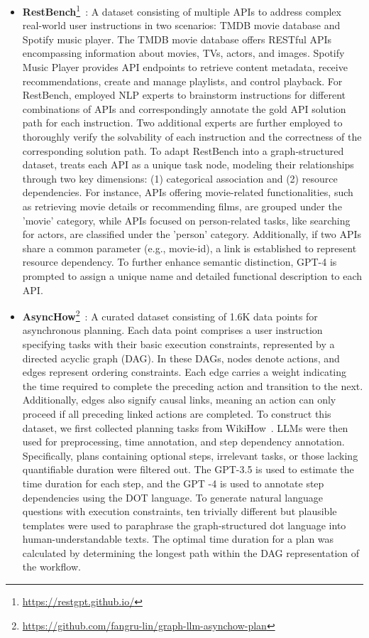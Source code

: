 \begin{itemize}[leftmargin=*]
    \item \textbf{RestBench}\footnote{\href{https://restgpt.github.io/}{https://restgpt.github.io/}}~\cite{song2023restgpt, wu2024can}: A dataset consisting of multiple APIs to address complex real-world user instructions in two scenarios: TMDB movie database and Spotify music player. The TMDB movie database offers RESTful APIs encompassing information about movies, TVs, actors, and images. Spotify Music Player provides API endpoints to retrieve content metadata, receive recommendations, create and manage playlists, and control playback. For RestBench, \cite{song2023restgpt} employed NLP experts to brainstorm instructions for different combinations of APIs and correspondingly annotate the gold API solution path for each instruction. Two additional experts are further employed to thoroughly verify the solvability of each instruction and the correctness of the corresponding solution path. To adapt RestBench into a graph-structured dataset, \cite{wu2024can} treats each API as a unique task node, modeling their relationships through two key dimensions: (1) categorical association and (2) resource dependencies. For instance, APIs offering movie-related functionalities, such as retrieving movie details or recommending films, are grouped under the 'movie' category, while APIs focused on person-related tasks, like searching for actors, are classified under the 'person' category. Additionally, if two APIs share a common parameter (e.g., movie-id), a link is established to represent resource dependency. To further enhance semantic distinction, GPT-4 is prompted to assign a unique name and detailed functional description to each API. 


    \item \textbf{AsyncHow}\footnote{\href{https://github.com/fangru-lin/graph-llm-asynchow-plan}{https://github.com/fangru-lin/graph-llm-asynchow-plan}}~\cite{lin2024graph}: A curated dataset consisting of 1.6K data points for asynchronous planning. Each data point comprises a user instruction specifying tasks with their basic execution constraints, represented by a directed acyclic graph (DAG). In these DAGs, nodes denote actions, and edges represent ordering constraints. Each edge carries a weight indicating the time required to complete the preceding action and transition to the next. Additionally, edges also signify causal links, meaning an action can only proceed if all preceding linked actions are completed. To construct this dataset, we first collected planning tasks from WikiHow~\cite{koupaee2018wikihow}. LLMs were then used for preprocessing, time annotation, and step dependency annotation. Specifically, plans containing optional steps, irrelevant tasks, or those lacking quantifiable duration were filtered out. The GPT-3.5 is used to estimate the time duration for each step, and the GPT -4 is used to annotate step dependencies using the DOT language. To generate natural language questions with execution constraints, ten trivially different but plausible templates were used to paraphrase the graph-structured dot language into human-understandable texts. The optimal time duration for a plan was calculated by determining the longest path within the DAG representation of the workflow.


\end{itemize}
